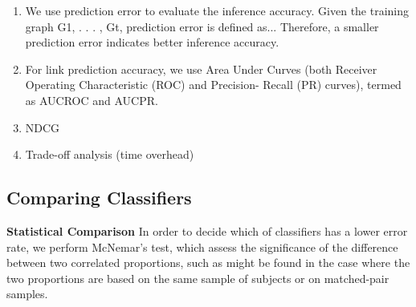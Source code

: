 \begin{enumerate}
    \item We use prediction error to evaluate the inference accuracy. Given the training graph G1, . . . , Gt, prediction error is defined as... Therefore, a smaller prediction error indicates better inference accuracy.
    
    \item For link prediction accuracy, we use Area Under Curves
(both Receiver Operating Characteristic (ROC) and Precision-
Recall (PR) curves), termed as AUCROC and AUCPR.

    \item NDCG
    
    \item Trade-off analysis (time overhead)
    
\end{enumerate}


\subsection{Comparing Classifiers}


\textbf{Statistical Comparison} In order to decide which of classifiers has a lower error rate, we perform McNemar's test, which assess the significance of the difference between two correlated proportions, such as might be found in the case where the two proportions are based on the same sample of subjects or on matched-pair samples.



